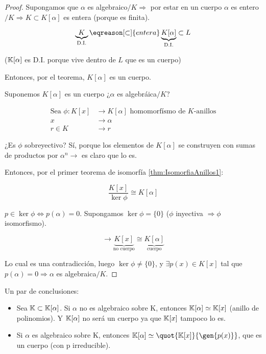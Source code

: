 	\begin{proof}

	\proofpart{$\implies$}

		Supongamos que $\alpha$ es algebraico$/K \Rightarrow$ por estar en un cuerpo $ \alpha$ es entero$/K \Rightarrow K \subset K[\alpha]$ es entera (porque es finita).

		\[ \underbrace{K}_{\text{D.I.}} \eqreason[\subset]{entera} \underbrace{K[\alpha]}_{\text{D.I.}} \subset L\]

		($\mathbb{K}[\alpha]$ es D.I. porque vive dentro de $L$ que es un cuerpo)

		Entonces, por el teorema, $K[\alpha]$ es un cuerpo.

	\proofpart{$\impliedby$}

		Suponemos $K[\alpha]$ es un cuerpo ¿$\alpha$ es algebráica$/K$?

		\begin{align*}
			\text{Sea } \phi: K[x] &\longrightarrow K[\alpha] \text{ homomorfísmo de }K\text{-anillos}\\
			x &\longrightarrow \alpha \\
			r\in K &\longrightarrow r
		\end{align*}

		¿Es $\phi$ sobreyectivo? Sí, porque los elementos de $K[\alpha]$ se construyen con sumas de productos por $\alpha^n \rightarrow $ es claro que lo es.

		Entonces, por el primer teorema de isomorfía \ref{thm:IsomorfiaAnillos1}:

		\[ \frac{K[x]}{\ker \phi} \cong K[\alpha]\]

		$p \in \ker \phi \Leftrightarrow p(\alpha) = 0 $. Supongamos $\ker \phi = \{0\}$ ($\phi$ inyectiva $\Rightarrow \phi$ isomorfismo).

		\[ \rightarrow \underbrace{K[x]}_{\text{no cuerpo}} \cong \underbrace{K[\alpha]}_{\text{cuerpo}}  \]

		Lo cual es una contradicción, luego $\ker \phi \neq \{0\}$, y $\exists p(x) \in K[x]$ tal que $p(\alpha) = 0 \Rightarrow \alpha $ es algebraica$/K$.
	\end{proof}



Un par de conclusiones:
\begin{itemize}
\item Sea  $\mathbb{K} \subset \mathbb{K}[\alpha]$. Si $\alpha$ no es algebraico sobre K, entonces $\mathbb{K}[\alpha]\simeq \mathbb{K}[x]$ (anillo de polinomios). Y $\mathbb{K}[\alpha]$ no será un cuerpo ya que $\mathbb{K}[x]$ tampoco lo es.
\item Si $\alpha$ es algebraico sobre K, entonces $\K[\alpha] \simeq \quot{\K[x]}{\gen{p(x)}}$, que es un cuerpo (con p irreducible).
\end{itemize}

